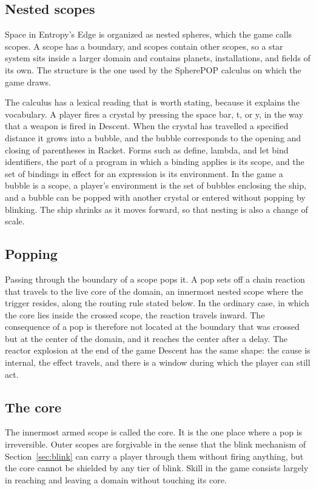 \documentclass[11pt]{article}
\begin{document}
\subsection{Nested scopes}

Space in Entropy's Edge is organized as nested spheres, which the game calls scopes. A scope has a boundary, and scopes contain other scopes, so a star system sits inside a larger domain and contains planets, installations, and fields of its own. The structure is the one used by the SpherePOP calculus on which the game draws.

The calculus has a lexical reading that is worth stating, because it explains the vocabulary. A player fires a crystal by pressing the space bar, t, or y, in the way that a weapon is fired in Descent. When the crystal has travelled a specified distance it grows into a bubble, and the bubble corresponds to the opening and closing of parentheses in Racket. Forms such as define, lambda, and let bind identifiers, the part of a program in which a binding applies is its scope, and the set of bindings in effect for an expression is its environment. In the game a bubble is a scope, a player's environment is the set of bubbles enclosing the ship, and a bubble can be popped with another crystal or entered without popping by blinking. The ship shrinks as it moves forward, so that nesting is also a change of scale.

\subsection{Popping}

Passing through the boundary of a scope pops it. A pop sets off a chain reaction that travels to the live core of the domain, an innermost nested scope where the trigger resides, along the routing rule stated below. In the ordinary case, in which the core lies inside the crossed scope, the reaction travels inward. The consequence of a pop is therefore not located at the boundary that was crossed but at the center of the domain, and it reaches the center after a delay. The reactor explosion at the end of the game Descent has the same shape: the cause is internal, the effect travels, and there is a window during which the player can still act.

\subsection{The core}

The innermost armed scope is called the core. It is the one place where a pop is irreversible. Outer scopes are forgivable in the sense that the blink mechanism of Section~\ref{sec:blink} can carry a player through them without firing anything, but the core cannot be shielded by any tier of blink. Skill in the game consists largely in reaching and leaving a domain without touching its core.
\end{document}
